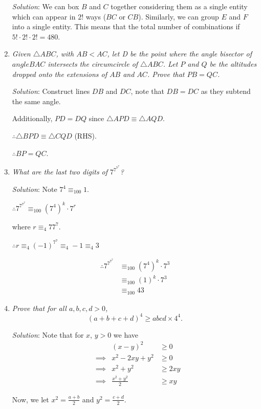 \documentclass{article}
\begin{document}
\begin{enumerate}[1.]
\textit{Solution}:
We can box $B$ and $C$ together considering them as a single entity which can appear in $2!$ ways ($BC$ or $CB$). Similarly, we can group $E$ and $F$ into a single entity. This means that the total number of combinations if $5! \cdot 2! \cdot 2! = 480$.


\item %
\textit{Given $\triangle ABC$, with $AB < AC$, let D be the point where the angle bisector of $angle BAC$ intersects the circumcircle of $\triangle ABC$.
Let $P$ and $Q$ be the altitudes dropped onto the extensions of $AB$ and $AC$.
Prove that $PB = QC$.
}

\textit{Solution}:
Construct lines $DB$ and $DC$, note that $DB = DC$ as they subtend the same angle.

Additionally, $PD = DQ$ since $\triangle APD \equiv \triangle AQD$.

$\therefore \triangle BPD \equiv \triangle CQD$ (RHS).

$\therefore BP = QC$.


\item %
\textit{What are the last two digits of $7^{7^{7^{7}}}$?}

\textit{Solution}:
Note $7^4 \equiv _{100} 1$.

$\therefore 7^{7^{7^7}} \equiv _{100} (7^4)^k \cdot 7^r$

where $r \equiv _4 7{7^7}$.

$\therefore r \equiv _4 (-1)^{7^7} \equiv _4 -1 \equiv _4 3$

\begin{align*}
\therefore 7^{7^{7^7}} &\equiv _{100} (7^4)^k \cdot 7^3 \\
&\equiv _{100} (1)^k \cdot 7^3 \\
&\equiv _{100} 43
\end{align*}


\item %
\textit{Prove that for all $a, b, c, d > 0$,
\[ (a + b + c + d)^{4} \geq abcd \times 4^{4}. \]
}

\textit{Solution}:
Note that for $x$, $y > 0$ we have 
\begin{align*}
  && (x - y)^2 &\ge 0 \\
  &\implies& x^2 - 2xy + y^2 &\ge 0 \\
  &\implies& x^2 + y^2 &\ge 2xy \\
  &\implies& \frac{x^2 + y^2}{2} &\ge xy
\end{align*}

Now, we let $x^2 = \frac{a + b}{2}$ and $y^2 = \frac{c + d}{2}$.


\end{enumerate}
\end{document}
